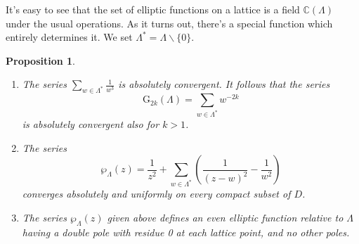 \documentclass{article}
\newtheorem{proposition}{Proposition}
\theoremstyle{remark}
\begin{document}
It's easy to see that the set of elliptic functions on a lattice is a field $\mathbb{C}(\Lambda)$ under the usual operations. As it turns out, there's a special function which entirely determines it. We set $\Lambda^*=\Lambda \backslash \{0\}$.

\begin{proposition}
\begin{enumerate}
\item The series $\sum_{w\in \Lambda^*}\frac{1}{w^3}$ is absolutely convergent. It follows that the series
\[ \text{G}_{2k} (\Lambda)=\sum_{w\in \Lambda^*} w^{-2k} \]
is absolutely convergent also for $k>1$.

\item The series 
\[ \wp_\Lambda (z)=\frac{1}{z^2}+\sum_{w \in \Lambda^*} \left( \frac{1}{(z-w)^2}-\frac{1}{w^2} \right) \]
converges absolutely and uniformly on every compact subset of $D$.
\item The series $\wp_\Lambda (z)$ given above defines an even elliptic function relative to $\Lambda$ having a double pole with residue 0 at each lattice point, and no other poles.
\end{enumerate}
\end{proposition}
\end{document}
